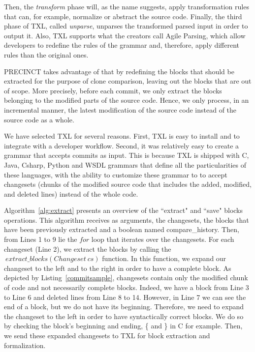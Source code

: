 \documentclass[conference]{IEEEtran}
\begin{document}
Then, the \textit{transform} phase will, as the name suggests, apply transformation rules that can, for example, normalize or abstract the source code. Finally, the third phase of TXL,  called \textit{unparse}, unparses the transformed parsed input in order to output it.
Also, TXL supports what the creators call Agile Parsing\cite{Dean}, which allow developers to redefine the rules of the grammar and, therefore, apply different rules than the original ones.


PRECINCT takes advantage of that by redefining the blocks that should be extracted for the purpose of clone comparison, leaving out the  blocks that are out of scope.
More precisely, before each commit, we only extract the blocks belonging to the modified parts of the source code.
Hence, we only process, in an incremental manner, the latest modification of the source code instead of the source code as a whole.

We have selected TXL for several reasons. First, TXL is easy to install and to integrate with a developer workflow.
Second, it was relatively easy to create a grammar that accepts commits as input.
This is because TXL is shipped with C, Java, Csharp, Python and WSDL grammars that define all the particularities of these languages, with the ability to customize these grammar to to accept changesets (chunks of the modified source code that includes the added, modified, and deleted lines) instead of the whole code.

Algorithm~\ref{alg:extract} presents an overview of the ``extract" and ``save" blocks operations. This algorithm receives as arguments, the changesets, the blocks that have been previously extracted and a boolean named compare\_history.
Then, from Lines 1 to 9 lie the $for$ loop that iterates over the changesets. For each changeset (Line 2), we extract the blocks by calling the $~extract\_blocks(Changeset~cs)$ function.
In this function, we expand our changeset to the left and to the right in order to have a complete block.
As depicted by Listing~\ref{commitsample}, changesets contain only the modified chunk of code and not necessarily complete blocks. Indeed, we have a block from Line 3 to Line 6 and deleted lines from Line 8 to 14.
However, in Line 7 we can see the end of a block, but we do not have its beginning. Therefore, we need to expand the changeset to the left in order to have syntactically correct blocks.
We do so by checking the block's beginning and ending, \{ and \} in C for example.
Then, we send these expanded changesets to TXL for block extraction and formalization.
\end{document}
